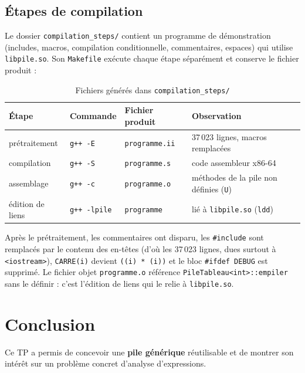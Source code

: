 \documentclass[11pt,a4paper]{article}
\newcommand{\code}[1]{\texttt{#1}}
\begin{document}
\subsection{Étapes de compilation}

Le dossier \code{compilation\_steps/} contient un programme de démonstration
(includes, macros, compilation conditionnelle, commentaires, espaces) qui
utilise \code{libpile.so}. Son \code{Makefile} exécute chaque étape
séparément et conserve le fichier produit :

\begin{table}[H]
\centering
\small
\begin{tabular}{llll}
  \toprule
  \textbf{Étape} & \textbf{Commande} & \textbf{Fichier produit} & \textbf{Observation} \\
  \midrule
  prétraitement   & \code{g++ -E} & \code{programme.ii} & 37\,023 lignes, macros remplacées \\
  compilation     & \code{g++ -S} & \code{programme.s}  & code assembleur x86-64 \\
  assemblage      & \code{g++ -c} & \code{programme.o}  & méthodes de la pile non définies (\code{U}) \\
  édition de liens & \code{g++ -lpile} & \code{programme} & lié à \code{libpile.so} (\code{ldd}) \\
  \bottomrule
\end{tabular}
\caption{Fichiers générés dans \code{compilation\_steps/}}
\end{table}

{\sloppy
Après le prétraitement, les commentaires ont disparu, les \code{\#include}
sont remplacés par le contenu des en-têtes (d'où les 37\,023 lignes, dues
surtout à \code{<iostream>}), \code{CARRE(i)} devient \code{((i) * (i))} et
le bloc \code{\#ifdef DEBUG} est supprimé. Le fichier objet
\code{programme.o} référence \code{PileTableau<int>::empiler} sans le
définir : c'est l'édition de liens qui le relie à \code{libpile.so}.\par}

\section{Conclusion}

Ce TP a permis de concevoir une \textbf{pile générique} réutilisable et de
montrer son intérêt sur un problème concret d'analyse d'expressions.
\end{document}
